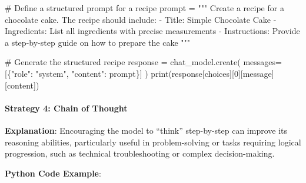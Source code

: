 \documentclass[
]{agujournal2019}
\let\oldparagraph\paragraph
\renewcommand{\paragraph}[1]{\oldparagraph{#1}\mbox{}}
\newenvironment{Shaded}{\begin{snugshade}}{\end{snugshade}}
\newcommand{\BuiltInTok}[1]{\textcolor[rgb]{0.00,0.23,0.31}{#1}}
\newcommand{\CommentTok}[1]{\textcolor[rgb]{0.37,0.37,0.37}{#1}}
\newcommand{\DecValTok}[1]{\textcolor[rgb]{0.68,0.00,0.00}{#1}}
\newcommand{\NormalTok}[1]{\textcolor[rgb]{0.00,0.23,0.31}{#1}}
\newcommand{\OperatorTok}[1]{\textcolor[rgb]{0.37,0.37,0.37}{#1}}
\newcommand{\StringTok}[1]{\textcolor[rgb]{0.13,0.47,0.30}{#1}}
\begin{document}
\begin{Shaded}
\begin{Highlighting}[]
\CommentTok{\# Define a structured prompt for a recipe}
\NormalTok{prompt }\OperatorTok{=} \StringTok{"""}
\StringTok{Create a recipe for a chocolate cake. The recipe should include:}
\StringTok{{-} Title: Simple Chocolate Cake}
\StringTok{{-} Ingredients: List all ingredients with precise measurements}
\StringTok{{-} Instructions: Provide a step{-}by{-}step guide on how to prepare the cake}
\StringTok{"""}

\CommentTok{\# Generate the structured recipe}
\NormalTok{response }\OperatorTok{=}\NormalTok{ chat\_model.create(}
\NormalTok{    messages}\OperatorTok{=}\NormalTok{[\{}\StringTok{"role"}\NormalTok{: }\StringTok{"system"}\NormalTok{, }\StringTok{"content"}\NormalTok{: prompt\}]}
\NormalTok{)}
\BuiltInTok{print}\NormalTok{(response[}\StringTok{\textquotesingle{}choices\textquotesingle{}}\NormalTok{][}\DecValTok{0}\NormalTok{][}\StringTok{\textquotesingle{}message\textquotesingle{}}\NormalTok{][}\StringTok{\textquotesingle{}content\textquotesingle{}}\NormalTok{])}
\end{Highlighting}
\end{Shaded}

\paragraph{Strategy 4: Chain of
Thought}\label{strategy-4-chain-of-thought}

\textbf{Explanation}: Encouraging the model to ``think'' step-by-step
can improve its reasoning abilities, particularly useful in
problem-solving or tasks requiring logical progression, such as
technical troubleshooting or complex decision-making.

\textbf{Python Code Example}:
\end{document}

